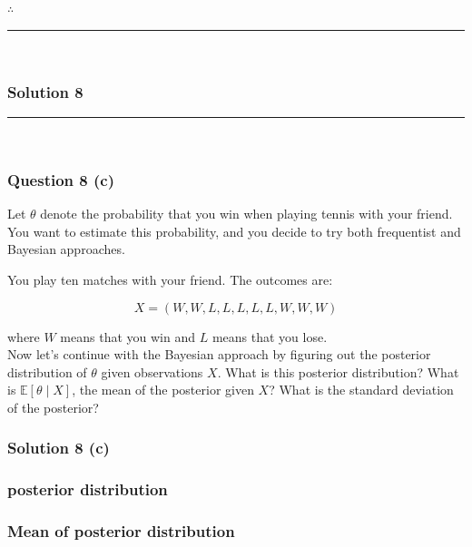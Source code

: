 \documentclass{article}
\begin{document}
\subsubsection*{\normalfont}{$\therefore$ } \\

\noindent\rule{\textwidth}{0.4pt}\\

\newpage

\subsubsection*{Solution 8}
\noindent\rule{\textwidth}{0.4pt}\\
\subsubsection*{Question 8 (c)}
\begin{flushleft}
Let $\theta$ denote the probability that you win when playing tennis with your friend. You want to estimate this probability, and you decide to try both frequentist and Bayesian approaches.

You play ten matches with your friend. The outcomes are:
\end{flushleft}
$$X = (W, W, L, L, L, L, L, W, W, W)$$

\begin{flushleft}
where $W$ means that you win and $L$ means that you lose.\\

Now let's continue with the Bayesian approach by figuring out the posterior distribution of $\theta$ given observations $X$. What is this posterior distribution? What is $\mathbb{E}[\theta \mid X]$, the mean of the posterior given $X$? What is the standard deviation of the posterior?
\end{flushleft}

\subsubsection*{Solution 8 (c)}


\subsubsection*{posterior distribution}


\subsubsection*{Mean of posterior distribution}
\end{document}
